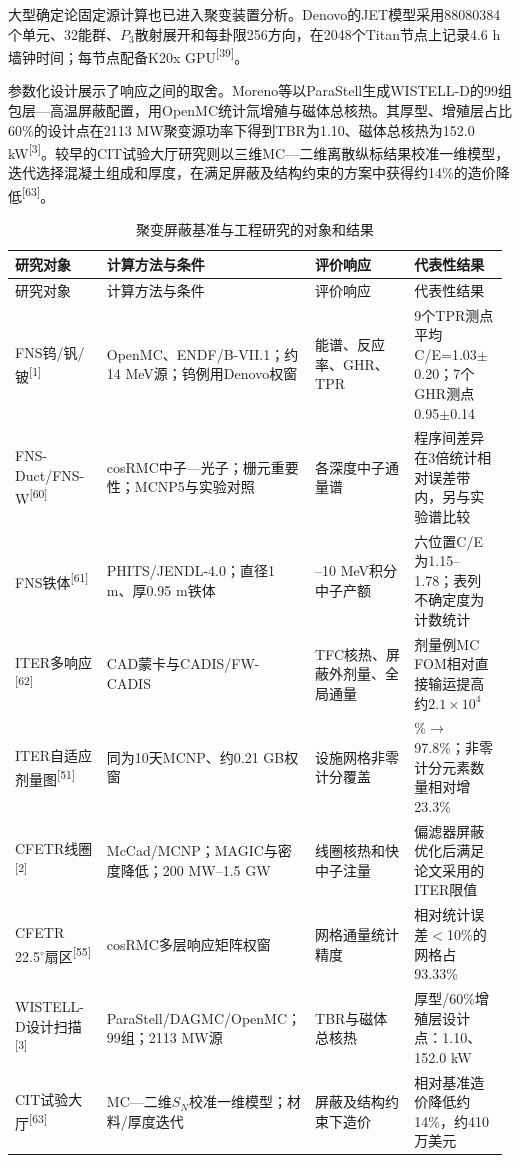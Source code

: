 \documentclass[UTF8, zihao=-4, fontset=none, a4paper]{ctexart}
\newcommand{\upcite}[1]{\textsuperscript{[#1]}}
\begin{document}
大型确定论固定源计算也已进入聚变装置分析。Denovo的JET模型采用88080384个单元、32能群、\(P_{3}\)散射展开和每卦限256方向，在2048个Titan节点上记录4.6 h墙钟时间；每节点配备K20x GPU\upcite{39}。

参数化设计展示了响应之间的取舍。Moreno等以ParaStell生成WISTELL-D的99组包层---高温屏蔽配置，用OpenMC统计氚增殖与磁体总核热。其厚型、增殖层占比60\%的设计点在2113 MW聚变源功率下得到TBR为1.10、磁体总核热为152.0 kW\upcite{3}。较早的CIT试验大厅研究则以三维MC---二维离散纵标结果校准一维模型，迭代选择混凝土组成和厚度，在满足屏蔽及结构约束的方案中获得约14\%的造价降低\upcite{63}。 \begin{longtable}{@{}>{\raggedright\arraybackslash}p{0.19\linewidth}>{\raggedright\arraybackslash}p{0.37\linewidth}>{\raggedright\arraybackslash}p{0.22\linewidth}>{\raggedright\arraybackslash}p{0.20\linewidth}@{}}
\caption{聚变屏蔽基准与工程研究的对象和结果}\label{tab:5}\\
\toprule
研究对象 & 计算方法与条件 & 评价响应 & 代表性结果 \\
\midrule
\endfirsthead
\toprule
研究对象 & 计算方法与条件 & 评价响应 & 代表性结果 \\
\midrule
\endhead
\bottomrule
\endlastfoot
FNS钨/钒/铍\upcite{1} & OpenMC、ENDF/B-VII.1；约14 MeV源；钨例用Denovo权窗 & 能谱、反应率、GHR、TPR & 9个TPR测点平均C/E=1.03$\pm$0.20；7个GHR测点0.95$\pm$0.14 \\
FNS-Duct/FNS-W\upcite{60} & cosRMC中子—光子；栅元重要性；MCNP5与实验对照 & 各深度中子通量谱 & 程序间差异在3倍统计相对误差带内，另与实验谱比较 \\
FNS铁体\upcite{61} & PHITS/JENDL-4.0；直径1 m、厚0.95 m铁体 & 0.003--10 MeV积分中子产额 & 六位置C/E为1.15--1.78；表列不确定度为计数统计 \\
ITER多响应\upcite{62} & CAD蒙卡与CADIS/FW-CADIS & TFC核热、屏蔽外剂量、全局通量 & 剂量例MC FOM相对直接输运提高约$2.1\times10^{4}$ \\
ITER自适应剂量图\upcite{51} & 同为10天MCNP、约0.21 GB权窗 & 设施网格非零计分覆盖 & 79.3\%$\rightarrow$97.8\%；非零计分元素数量相对增23.3\% \\
CFETR线圈\upcite{2} & McCad/MCNP；MAGIC与密度降低；200 MW--1.5 GW & 线圈核热和快中子注量 & 偏滤器屏蔽优化后满足论文采用的ITER限值 \\
CFETR 22.5$^\circ$扇区\upcite{55} & cosRMC多层响应矩阵权窗 & 网格通量统计精度 & 相对统计误差$<$10\%的网格占93.33\% \\
WISTELL-D设计扫描\upcite{3} & ParaStell/DAGMC/OpenMC；99组；2113 MW源 & TBR与磁体总核热 & 厚型/60\%增殖层设计点：1.10、152.0 kW \\
CIT试验大厅\upcite{63} & MC—二维$S_N$校准一维模型；材料/厚度迭代 & 屏蔽及结构约束下造价 & 相对基准造价降低约14\%，约410万美元 \\
\end{longtable}
\end{document}
